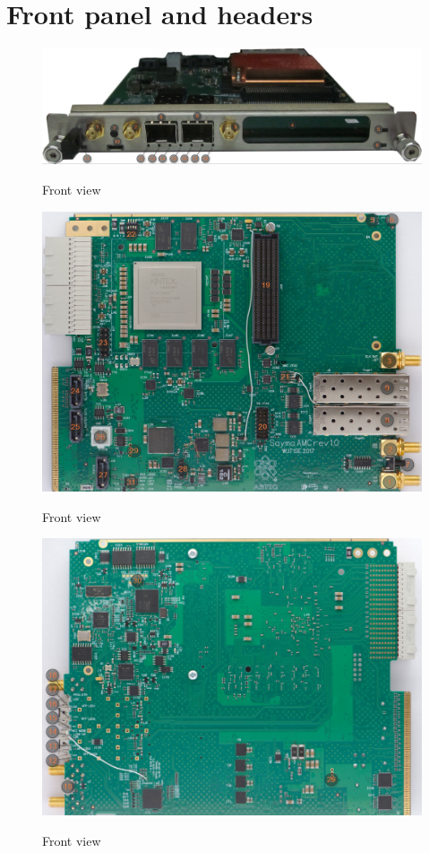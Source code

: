 \section{Front panel and headers}

		\begin{figure}[htbp!]
			\centering
			\includegraphics[width=14cm]{img/frontcallout.png}\\
			\caption{Front view}
		\end{figure}
		
		\begin{figure}[htbp!]
			\centering
			\includegraphics[width=14cm]{img/topcallout1.png}\\
			\caption{Front view}
		\end{figure}
\clearpage
		\begin{figure}[htbp!]
			\centering
			\includegraphics[width=14cm]{img/botcallout1.png}\\
			\caption{Front view}
		\end{figure}

